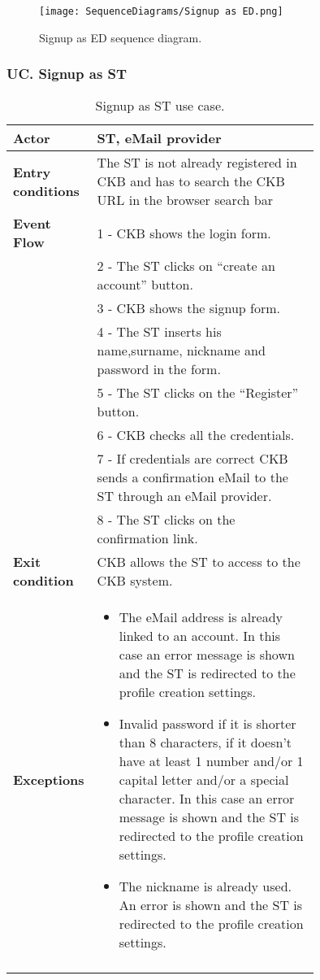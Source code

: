 \begin{figure}[H]
    \begin{center}
        \texttt{[image: SequenceDiagrams/Signup as ED.png]}
        \caption{Signup as ED sequence diagram.}
        \label{fig:signup_as_ED_seqd}%
    \end{center}
\end{figure}

\subsubsection*{UC\cuc . Signup as ST}
\begin{center}
    \begin{longtable}{|l|p{0.75\linewidth}|}
        \hline
        \textbf{Actor}            & ST, eMail provider \\
        \hline
        \textbf{Entry conditions} & The ST is not already registered in CKB and has to search the CKB URL in the browser search bar \\
        \hline
        \textbf{Event Flow}       & 1 - CKB shows the login form.  \\
        & 2 - The ST clicks on “create an account” button.  \\
        & 3 - CKB shows the signup form.  \\
        & 4 - The ST inserts his name,surname, nickname and password in the form.  \\
        & 5 - The ST clicks on the “Register” button.  \\
        & 6 - CKB checks all the credentials.  \\
        & 7 - If credentials are correct CKB sends a confirmation eMail to the ST through an eMail provider.  \\
        & 8 - The ST clicks on the confirmation link. \\
        \hline
        \textbf{Exit condition}   & CKB allows the ST to access to the CKB system. \\
        \hline
        \textbf{Exceptions}       & \begin{itemize}
            \item The eMail address is already linked to an account. In this case an error message is shown and the ST is redirected to the profile creation settings.
            \item Invalid password if it is shorter than 8 characters, if it doesn’t have at least 1 number and/or 1 capital letter and/or a special character. In this case an error message is shown and the ST is redirected to the profile creation settings.
            \item The nickname is already used. An error is shown and the ST is redirected to the profile creation settings.
        \end{itemize} \\
        \hline
        \caption{Signup as ST use case.}
        \label{tab: signup_as_ST_use_case}
    \end{longtable}
\end{center}

